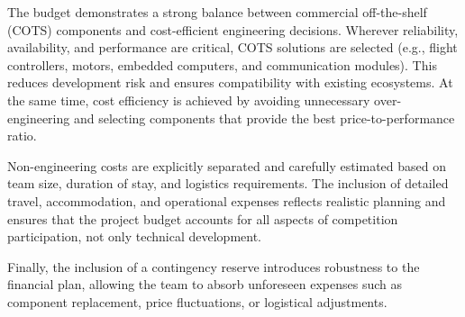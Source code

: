 The budget demonstrates a strong balance between commercial off-the-shelf (COTS) 
components and cost-efficient engineering decisions. Wherever reliability, availability, 
and performance are critical, COTS solutions are selected (e.g., flight controllers, 
motors, embedded computers, and communication modules). This reduces development risk 
and ensures compatibility with existing ecosystems. At the same time, cost efficiency 
is achieved by avoiding unnecessary over-engineering and selecting components that 
provide the best price-to-performance ratio.

Non-engineering costs are explicitly separated and carefully estimated based on team size, 
duration of stay, and logistics requirements. The inclusion of detailed travel, accommodation, 
and operational expenses reflects realistic planning and ensures that the project budget 
accounts for all aspects of competition participation, not only technical development.

Finally, the inclusion of a contingency reserve introduces robustness to the financial plan, 
allowing the team to absorb unforeseen expenses such as component replacement, price 
fluctuations, or logistical adjustments.




